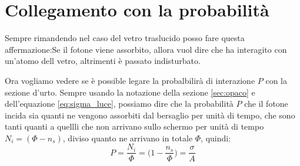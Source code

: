 \documentclass[11pt,a4paper]{article}
\begin{document}
	\section{Collegamento con la probabilità}
		Sempre rimandendo nel caso del vetro traslucido posso fare questa affermazione:Se il fotone viene assorbito, allora vuol dire che ha interagito con un'atomo dell vetro, altrimenti è passato indisturbato.\newline

		Ora vogliamo vedere se è possible legare la probalbilirà di interazione $P$ con la sezione d'urto.\newline
		Sempre usando la notazione della sezione \ref{sec:opaco} e dell'equazione \ref{eq:sigma_luce}, possiamo dire che la probabilità $P$ che il fotone incida sia quanti ne vengono assorbiti dal bersaglio per unità di tempo, che sono tanti quanti a quellli che non arrivano sullo schermo per unità di tempo $N_i=(\Phi-n_s)$, diviso quanto ne arrivano in totale $\Phi$, quindi:
		\begin{equation}
			P=\frac {N_i} \Phi=\Big(1-\frac {n_s}\Phi\Big)=\frac\sigma A
			\label{eq:prob1}
		\end{equation}
\end{document}
